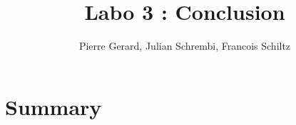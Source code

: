 \documentclass[a4paper]{article}
\title{Labo 3 : Conclusion}
\author{Pierre Gerard, Julian Schrembi, Francois Schiltz}
\begin{document}
\maketitle

\section{Summary}
\end{document}
